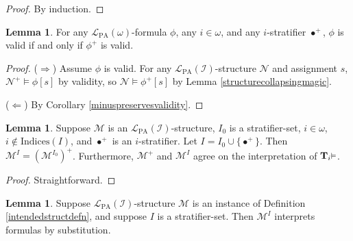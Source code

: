 \documentclass[reqno]{article}
\theoremstyle{definition}
\newtheorem{lemma}[theorem]{Lemma}
\def\L{\mathscr{L}}
\def\M{\mathscr{M}}
\def\T{\mathbf{T}}
\def\indices{\mathrm{Indices}}
\def\LPA{\L_{\mathrm{PA}}}
\def\indset{\mathcal I}
\renewcommand{\Pr}[1]{\T_{#1}\mbox{\small${\vDash}$}}
\begin{document}

\begin{proof}
By induction.
\end{proof}


\begin{lemma}
\label{stratifiersrespectvalidity}
For any $\LPA(\omega)$-formula $\phi$,
any $i\in\omega$, and any $i$-stratifier $\bullet^+$,
$\phi$ is valid if and only if $\phi^+$ is valid.
\end{lemma}

\begin{proof}
\item
($\Rightarrow$)
Assume $\phi$ is valid.
For any $\LPA(\indset)$-structure $\mathscr N$ and assignment $s$,
$\mathscr N^+\models\phi[s]$ by validity, so $\mathscr N\models\phi^+[s]$ by
Lemma \ref{structurecollapsingmagic}.

\item
($\Leftarrow$)
By Corollary \ref{minuspreservesvalidity}.
\end{proof}

\begin{lemma}
\label{decomposingMtotheI}
Suppose $\M$ is an $\LPA(\indset)$-structure,
$I_0$ is a stratifier-set, $i\in\omega$, $i\not\in\indices(I)$,
and $\bullet^+$ is an $i$-stratifier.
Let $I=I_0\cup\{\bullet^+\}$.
Then $\M^I=(\M^{I_0})^+$.
Furthermore, $\M^+$ and $\M^I$ agree on the interpretation of $\Pr i$.
\end{lemma}

\begin{proof}
Straightforward.
\end{proof}

\begin{lemma}
\label{raisingMtotheIpreservesintent}
Suppose $\LPA(\indset)$-structure $\M$ is an instance of
Definition \ref{intendedstructdefn}, and suppose
$I$ is a stratifier-set.
Then $\M^I$ interprets formulas by substitution.
\end{lemma}
\end{document}
